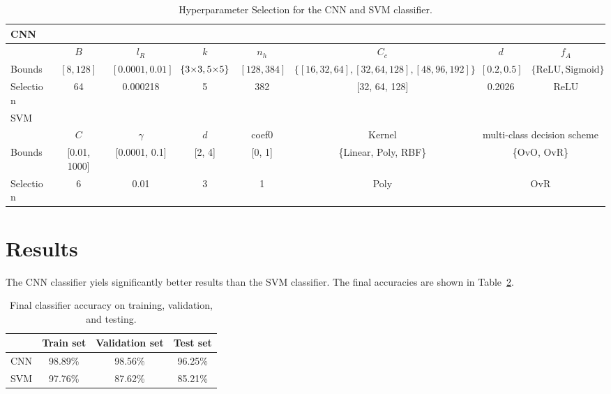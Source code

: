 \documentclass[a4, 10 pt, conference]{ieeeconf}  %
\begin{document}
\renewcommand{\arraystretch}{1.2}
\begin{table}[htbp]
  \centering
  \begin{tabular}{|l|c|c|c|c|c|c|c|}
    \hline
    \multicolumn{8}{|l|}{CNN} \\
    \hline
    & $B$ & $l_R$ & $k$ & $n_h$ & $C_c$ & $d$ & $f_A$ \\
    \hline
    Bounds & $[8,128]$ & $[0.0001, 0.01]$ & $\{\text{3\texttimes3}, \text{5\texttimes5}\}$ & $[128,384]$ & $\{[16,32,64],[32,64,128],[48,96,192]\}$ & $[0.2,0.5]$ & $\{\text{ReLU}, \text{Sigmoid}\}$ \\
    Selection & 64 & 0.000218 & 5\texttimes5 & 382 & [32, 64, 128] & 0.2026 & ReLU\\
    \hline
    \multicolumn{8}{|l|}{SVM} \\
    \hline
    & $C$ & $\gamma$ & $d$ & coef0 & Kernel & \multicolumn{2}{c|}{multi-class decision scheme} \\
    \hline
    Bounds & [0.01, 1000] & [0.0001, 0.1] & [2, 4] & [0, 1] & \{Linear, Poly, RBF\} & \multicolumn{2}{c|}{\{OvO, OvR\}} \\
    Selection & 6 & 0.01 & 3 & 1 & Poly & \multicolumn{2}{c|}{OvR} \\
    \hline
  \end{tabular}
  \caption{Hyperparameter Selection for the CNN and SVM classifier.}
  \label{fig:hyperparameter_selection}
\end{table}

\section{Results}
\label{sec:results}

The CNN classifier yiels significantly better results than the SVM classifier.
The final accuracies are shown in Table~\ref{tab:classifier_accuracy}.


\begin{table}[H]
  \centering
  \begin{tabular}{|l|c|c|c|}
    \hline
    & Train set & Validation set & Test set\\
    \hline
    CNN & 98.89\% & 98.56\% & 96.25\%\\
    SVM & 97.76\% & 87.62\% & 85.21\%\\
    \hline
  \end{tabular}
  \caption{Final classifier accuracy on training, validation, and testing.}
  \label{tab:classifier_accuracy}
\end{table}
\end{document}
